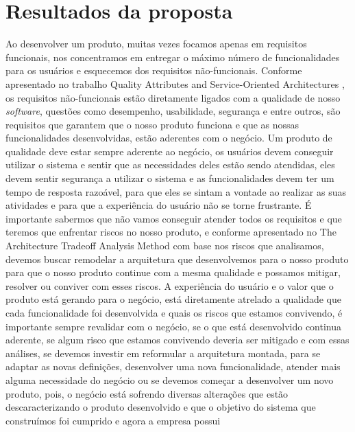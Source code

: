   \chapter{Resultados da proposta}
    Ao desenvolver um produto, muitas vezes focamos apenas em requisitos
    funcionais, nos concentramos em entregar o máximo número de funcionalidades
    para os usuários e esquecemos dos requisitos não-funcionais. Conforme apresentado
    no trabalho Quality Attributes and Service-Oriented Architectures
    \cite{O'BrienQualityAttributes2005}, os requisitos não-funcionais estão diretamente
    ligados com a qualidade de nosso \textit{software}, questões como desempenho,
    usabilidade, segurança e entre outros, são requisitos que garantem que o nosso
    produto funciona e que as nossas funcionalidades desenvolvidas, estão aderentes
    com o negócio. \newline
    Um produto de qualidade deve estar sempre aderente ao negócio, os usuários devem
    conseguir utilizar o sistema e sentir que as necessidades deles estão sendo
    atendidas, eles devem sentir segurança a utilizar o sistema e as funcionalidades
    devem ter um tempo de resposta razoável, para que eles se sintam a vontade ao
    realizar as suas atividades e para que a experiência do usuário não se torne
    frustrante. É importante sabermos que não vamos conseguir atender todos os
    requisitos e que teremos que enfrentar riscos no nosso produto, e conforme
    apresentado no The Architecture Tradeoff Analysis Method \cite{KazmanTheArchitecture1998}
    com base nos riscos que analisamos, devemos buscar remodelar a arquitetura que
    desenvolvemos para o nosso produto para que o nosso produto continue com a
    mesma qualidade e possamos mitigar, resolver ou conviver com esses riscos.
    A experiência do usuário e o valor que o produto está gerando para o negócio,
    está diretamente atrelado a qualidade que cada funcionalidade foi desenvolvida
    e quais os riscos que estamos convivendo, é importante sempre revalidar com o
    negócio, se o que está desenvolvido continua aderente, se algum risco que
    estamos convivendo deveria ser mitigado e com essas análises, se devemos
    investir em reformular a arquitetura montada, para se adaptar as novas definições,
    desenvolver uma nova funcionalidade, atender mais alguma necessidade do negócio
    ou se devemos começar a desenvolver um novo produto, pois, o negócio está
    sofrendo diversas alterações que estão descaracterizando o produto desenvolvido
    e que o objetivo do sistema que construímos foi cumprido e agora a empresa possui
